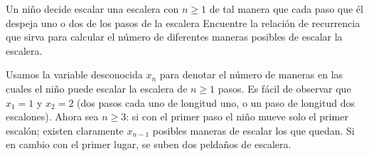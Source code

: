 \begin{example}[La escalera]
	Un niño decide escalar una escalera con $n\geq 1$ de tal manera que cada paso que él despeja uno o dos de los pasos de la escalera %
	Encuentre la relación de recurrencia que sirva para calcular el número de diferentes maneras posibles de escalar la escalera.
\end{example}
Usamos la variable desconocida $x_{n}$ para denotar el número de maneras en las cuales el niño puede escalar la escalera de $n\geq1$ pasos. Es fácil de observar que $x_{1}=1$ y $x_{2}=2$ (dos pasos cada uno de longitud uno, o un paso de longitud dos escalones). Ahora sea $n\geq3$: si con el primer paso el niño mueve solo el primer escalón; existen claramente $x_{n-1}$ posibles maneras de escalar los que quedan. Si en cambio con el primer lugar, se suben dos peldaños de escalera.